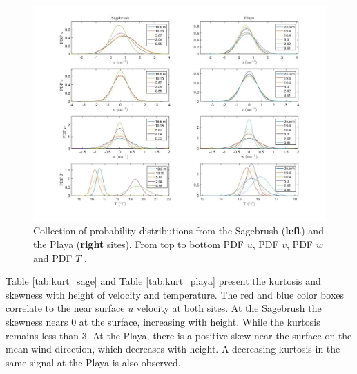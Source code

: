 \documentclass[]{article}
\begin{document}
\begin{figure}
	\centering
	\includegraphics[width=\textwidth]{pdf}
	\caption{Collection of probability distributions from the Sagebrush (\textbf{left}) and the Playa (\textbf{right} sites). From top to bottom PDF $u$, PDF $v$,  PDF $w$ and PDF $T$ . }
	\label{fig:pdf}
\end{figure}
Table \ref{tab:kurt_sage} and Table \ref{tab:kurt_playa} present the kurtosis and skewness with height of velocity and temperature. The red and blue color boxes correlate to the near surface $u$ velocity at both sites. At the Sagebrush the skewness nears 0 at the surface, increasing with height. While the kurtosis remains less than 3. At the Playa, there is a positive skew near the surface on the mean wind direction, which decreases with height. A decreasing kurtosis in the same signal at the Playa is also observed.
\end{document}

